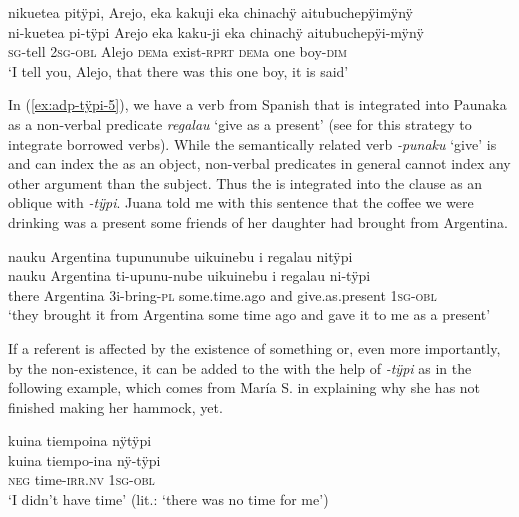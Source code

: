 \ea\label{ex:adp-tÿpi-4}
\begingl
\glpreamble nikuetea pitÿpi, Arejo, eka kakuji eka chinachÿ aitubuchepÿimÿnÿ\\
\gla ni-kuetea pi-tÿpi Arejo eka kaku-ji eka chinachÿ aitubuchepÿi-mÿnÿ\\
\textsc{sg}-tell 2\textsc{sg}-\textsc{obl} Alejo \textsc{dem}a exist-\textsc{rprt} \textsc{dem}a one boy-\textsc{dim}\\
\glft ‘I tell you, Alejo, that there was this one boy, it is said’
\endgl
\trailingcitation{[mtx-a110906l.002]}
\xe

In (\ref{ex:adp-tÿpi-5}), we have a verb from Spanish that is integrated into Paunaka as a non-verbal predicate \textit{regalau} ‘give as a present’ (see  for this strategy to integrate borrowed verbs). While the semantically related verb \textit{-punaku} ‘give’ is  and can index the  as an object, non-verbal predicates in general cannot index any other argument than the subject. Thus the  is integrated into the clause as an oblique with \textit{-tÿpi}. Juana told me with this sentence that the coffee we were drinking was a present some friends of her daughter had brought from Argentina.

\ea\label{ex:adp-tÿpi-5}
\begingl
\glpreamble nauku Argentina tupununube uikuinebu i regalau nitÿpi\\
\gla nauku Argentina ti-upunu-nube uikuinebu i regalau ni-tÿpi\\
\glb there Argentina 3i-bring-\textsc{pl} some.time.ago and give.as.present 1\textsc{sg}-\textsc{obl}\\
\glft ‘they brought it from Argentina some time ago and gave it to me as a present’
\endgl
\trailingcitation{[jxx-e120430l-4.28-29]}
\xe

If a referent is affected by the existence of something or, even more importantly, by the non-existence, it can be added to the  with the help of \textit{-tÿpi} as in the following example, which comes from María S. in explaining why she has not finished making her hammock, yet.

\ea\label{ex:adp-tÿpi-9}
\begingl
\glpreamble kuina tiempoina nÿtÿpi\\
\gla kuina tiempo-ina nÿ-tÿpi\\
\glb \textsc{neg} time-\textsc{irr.nv} 1\textsc{sg}-\textsc{obl}\\
\glft ‘I didn’t have time’ (lit.: ‘there was no time for me’)
\endgl
\trailingcitation{[rxx-e181022le]}
\xe

